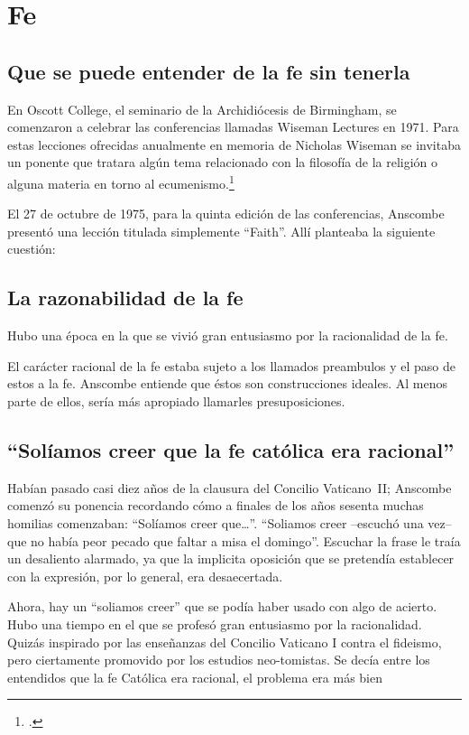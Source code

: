 \section{Fe}

\subsection{Que se puede entender de la fe sin tenerla}
En Oscott College, el seminario de la Archidiócesis de Birmingham, se comenzaron
a celebrar las conferencias llamadas Wiseman Lectures en 1971. Para estas
lecciones ofrecidas anualmente en memoria de Nicholas Wiseman se invitaba un
ponente que tratara algún tema relacionado con la filosofía de la religión o
alguna materia en torno al ecumenismo.\footcite[cf.~][p.~7]{wisemanlects}

El 27 de octubre de 1975, para la quinta edición de las conferencias, Anscombe
presentó una lección titulada simplemente ``Faith''. Allí planteaba la
siguiente cuestión: 

\subsection{La razonabilidad de la fe}
Hubo una época en la que se vivió gran entusiasmo por la racionalidad de la
fe.

El carácter racional de la fe estaba sujeto a los llamados preambulos y el
paso de estos a la fe. Anscombe entiende que éstos son construcciones ideales.
Al menos parte de ellos, sería más apropiado llamarles
presuposiciones.

\subsection{``Solíamos creer que la fe católica era racional''} Habían pasado
casi diez años de la clausura del Concilio Vaticano~II; Anscombe comenzó
su ponencia recordando cómo a finales de los años sesenta muchas homilias
comenzaban: ``Solíamos creer que\ldots''. ``Soliamos creer --escuchó una vez--
que no había peor pecado que faltar a misa el domingo''. Escuchar la frase le
traía un desaliento alarmado, ya que la implicita oposición que se pretendía
establecer con la expresión, por lo general, era desaecertada.

Ahora, hay un ``soliamos creer'' que se podía haber usado con algo de acierto.
Hubo una tiempo en el que se profesó gran entusiasmo por la racionalidad. Quizás
inspirado por las enseñanzas del Concilio Vaticano I contra el fideismo, pero
ciertamente promovido por los estudios neo-tomistas. Se decía entre los
entendidos que la fe Católica era racional, el problema era más bien
